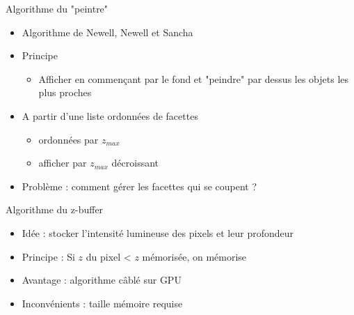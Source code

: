 \begin{frame}[t]{Algorithme du "peintre"}
  \begin{itemize}
    \item Algorithme de Newell, Newell et Sancha
    \item Principe
    \begin{itemize}
      \item Afficher en commençant par le fond et "peindre" par dessus les objets les plus proches
    \end{itemize}
    \item A partir d'une liste ordonnées de facettes
    \begin{itemize}
      \item  ordonnées par $z_{max}$
      \item afficher par $z_{max}$ décroissant
    \end{itemize}
    \item Problème : comment gérer les facettes qui se coupent ?
  \end{itemize}
\end{frame}

\begin{frame}[t]{Algorithme du z-buffer}
  \begin{itemize}
    \item Idée : stocker l'intensité lumineuse des pixels et leur profondeur
    \item Principe : Si $z$ du pixel < $z$ mémorisée, on mémorise
    \item Avantage : algorithme câblé sur GPU
    \item Inconvénients : taille mémoire requise
  \end{itemize}
\end{frame}

